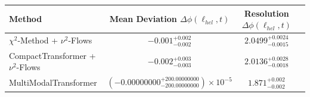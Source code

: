     \begin{tabular}{lccc}
        \toprule
        Method & Mean Deviation $\Delta\phi(\ell_{hel}, t)$ & Resolution $\Delta\phi(\ell_{hel}, t)$ \\
        \midrule
        $\chi^2$-Method + $\nu^2$-Flows & $-0.001^{+0.002}_{-0.002}$ & $2.0499^{+0.0024}_{-0.0015}$ \\
        CompactTransformer + $\nu^2$-Flows & $-0.002^{+0.003}_{-0.003}$ & $2.0136^{+0.0028}_{-0.0018}$ \\
        MultiModalTransformer & $(-0.00000000^{+200.00000000}_{-200.00000000})\times 10^{-5}$ & $1.871^{+0.002}_{-0.002}$ \\
        \bottomrule
    \end{tabular}